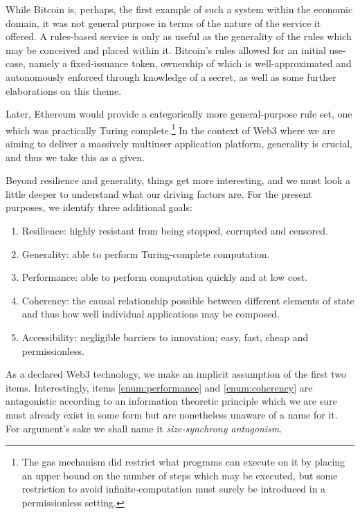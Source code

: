 While Bitcoin is, perhaps, the first example of such a system within the economic domain, it was not general purpose in terms of the nature of the service it offered. A rules-based service is only as useful as the generality of the rules which may be conceived and placed within it. Bitcoin's rules allowed for an initial use-case, namely a fixed-issuance token, ownership of which is well-approximated and autonomously enforced through knowledge of a secret, as well as some further elaborations on this theme.

Later, Ethereum would provide a categorically more general-purpose rule set, one which was practically Turing complete.\footnote{The gas mechanism did restrict what programs can execute on it by placing an upper bound on the number of steps which may be executed, but some restriction to avoid infinite-computation must surely be introduced in a permissionless setting.} In the context of Web3 where we are aiming to deliver a massively multiuser application platform, generality is crucial, and thus we take this as a given.

Beyond resilience and generality, things get more interesting, and we must look a little deeper to understand what our driving factors are. For the present purposes, we identify three additional goals:
\begin{enumerate}
  \item \label{enum:resilience} Resilience: highly resistant from being stopped, corrupted and censored.
  \item \label{enum:generality} Generality: able to perform Turing-complete computation.
  \item \label{enum:performance} Performance: able to perform computation quickly and at low cost.
  \item \label{enum:coherency} Coherency: the causal relationship possible between different elements of state and thus how well individual applications may be composed.
  \item \label{enum:accessibility} Accessibility: negligible barriers to innovation; easy, fast, cheap and permissionless.
\end{enumerate}

As a declared Web3 technology, we make an implicit assumption of the first two items. Interestingly, items \ref{enum:performance} and \ref{enum:coherency} are antagonistic according to an information theoretic principle which we are sure must already exist in some form but are nonetheless unaware of a name for it. For argument's sake we shall name it \emph{size-synchrony antagonism}.

